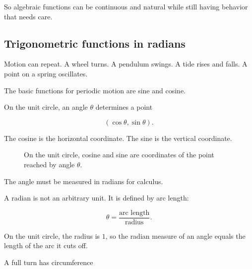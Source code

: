 So algebraic functions can be continuous and natural while still having behavior that needs care.

\subsection{Trigonometric functions in radians}
\label{subsec:trig-functions-radians}

Motion can repeat. A wheel turns. A pendulum swings. A tide rises and falls. A point on a spring oscillates.

The basic functions for periodic motion are sine and cosine.

On the unit circle, an angle \(\theta\) determines a point

\[
(\cos\theta,\sin\theta).
\]

The cosine is the horizontal coordinate. The sine is the vertical coordinate.

\begin{figure}[h]
\centering
{}
\caption{On the unit circle, cosine and sine are coordinates of the point reached by angle \(\theta\).}
\label{fig:unit-circle-sin-cos}
\end{figure}

The angle must be measured in radians for calculus.

A radian is not an arbitrary unit. It is defined by arc length:

\[
\theta=\frac{\text{arc length}}{\text{radius}}.
\]

On the unit circle, the radius is \(1\), so the radian measure of an angle equals the length of the arc it cuts off.

A full turn has circumference

